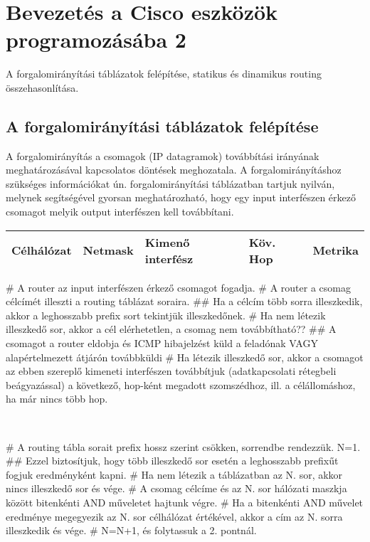 \section{Bevezetés a Cisco eszközök programozásába 2}
{\footnotesize A forgalomirányítási táblázatok felépítése, statikus és dinamikus routing összehasonlítása.}
\subsection{A forgalomirányítási táblázatok felépítése}
A forgalomirányítás a csomagok (IP datagramok) továbbítási irányának meghatározásával kapcsolatos döntések meghozatala. A forgalomirányításhoz szükséges információkat ún. forgalomirányítási táblázatban tartjuk nyilván, melynek segítségével gyorsan meghatározható, hogy egy input interfészen érkező csomagot melyik output interfészen kell továbbítani.\\
\begin{tabular}{|l|l|l|l|l|}
	\hline 
	Célhálózat & Netmask & Kimenő interfész & Köv. Hop & Metrika \\ 
	\hline 
\end{tabular}
\begin{easylist}
	# A router az input interfészen érkező csomagot fogadja.
	# A router a csomag célcímét illeszti a routing táblázat soraira.
	## Ha a célcím több sorra illeszkedik, akkor a leghosszabb prefix sort tekintjük illeszkedőnek.
	# Ha nem létezik illeszkedő sor, akkor a cél elérhetetlen, a csomag nem továbbítható??
	## A csomagot a router eldobja és ICMP hibajelzést küld a feladónak VAGY alapértelmezett átjárón továbbküldi
	# Ha létezik illeszkedő sor, akkor a csomagot az ebben szereplő kimeneti interfészen továbbítjuk (adatkapcsolati rétegbeli beágyazással) a következő, hop-ként megadott szomszédhoz, ill. a célállomáshoz, ha már nincs több hop.
\end{easylist}
~\\
\begin{easylist}
	# A routing tábla sorait prefix hossz szerint csökken, sorrendbe rendezzük. N=1.
	## Ezzel biztosítjuk, hogy több illeszkedő sor esetén a leghosszabb prefixűt fogjuk eredményként kapni.
	# Ha nem létezik a táblázatban az N. sor, akkor nincs illeszkedő sor és vége.
	# A csomag célcíme és az N. sor hálózati maszkja között bitenkénti AND műveletet hajtunk végre.
	# Ha a bitenkénti AND művelet eredménye megegyezik az N. sor célhálózat értékével, akkor a cím az N. sorra illeszkedik és vége.
	# N=N+1, és folytassuk a 2. pontnál.
\end{easylist}

